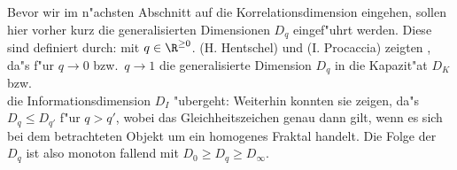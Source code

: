 Bevor wir im n"achsten Abschnitt auf die Korrelationsdimension eingehen, sollen hier
vorher kurz die generalisierten Dimensionen $D_q$ eingef"uhrt werden. Diese sind definiert
durch:
mit $q\in\R^{\geq0}$.
\autor(H. Hentschel) und \autor(I. Procaccia) zeigten \cite{Hentschel-procaccia}, da"s
f"ur $q\to0$ bzw.\ $q\to1$ die generalisierte Dimension $D_q$ in die Kapazit"at $D_K$
bzw.\\ die Informationsdimension $D_I$ "ubergeht:
Weiterhin konnten sie zeigen, da"s $D_q\leq D_{q'}$ f"ur $q>q'$, wobei das
Gleichheitszeichen genau dann gilt, wenn es sich bei dem betrachteten Objekt um ein
homogenes Fraktal handelt. Die Folge der $D_q$ ist also monoton fallend mit $D_0\geq
D_q\geq D_\infty$. 

